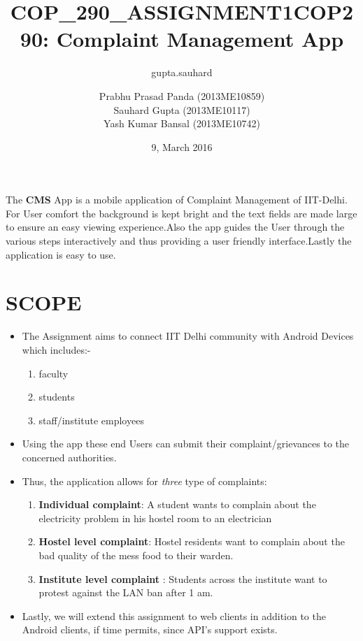 \documentclass{article}
\title{COP_290_ASSIGNMENT1}
\author{gupta.sauhard }
\date{9, March 2016}
\title{COP290: Complaint Management App}
\author{Prabhu Prasad Panda (2013ME10859) \\ 
Sauhard Gupta (2013ME10117) \\ 
Yash Kumar Bansal (2013ME10742) }
\begin{document}
\maketitle
   The \textbf{CMS} App is a mobile application of Complaint Management of IIT-Delhi. For User comfort the background is kept bright and the text fields are made large to ensure an easy viewing experience.Also the app guides the User through the various steps interactively and thus providing a user friendly interface.Lastly the application is easy to use.

\section{SCOPE}
\begin{itemize}
\item The Assignment aims to connect IIT Delhi community with Android Devices which includes:-
\begin{enumerate}
\item faculty
\item students 
\item staff/institute employees
\end{enumerate}
\item Using the app these end Users can submit their complaint/grievances to the concerned authorities.
\item Thus, the application allows for \textit{three} type of complaints:
\begin{enumerate}
\item \textbf{Individual complaint}: A student wants to complain about the electricity problem in his hostel room to an electrician
\item \textbf{ Hostel level complaint}: Hostel residents want to complain about
the bad quality of the mess food to their warden.
\item \textbf{ Institute level complaint }: Students across the institute want to protest against the LAN ban after 1 am.
\end{enumerate}
\item Lastly, we will  extend this assignment to web clients in addition to the Android clients, if time permits, since API's support exists.




\end{itemize}
\end{document}
